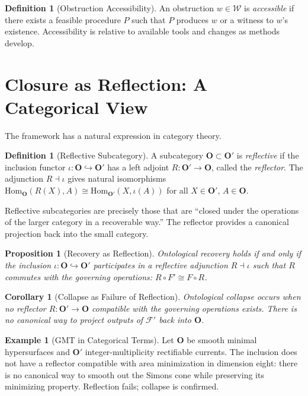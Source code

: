 \documentclass[12pt,oneside]{book}
\theoremstyle{plain}
\newtheorem{proposition}[theorem]{Proposition}
\newtheorem{corollary}[theorem]{Corollary}
\theoremstyle{definition}
\newtheorem{definition}[theorem]{Definition}
\newtheorem{example}[theorem]{Example}
\theoremstyle{remark}
\newcommand{\F}{\mathcal{F}}
\newcommand{\W}{\mathcal{W}}
\newcommand{\bO}{\mathbf{O}}
\newcommand{\bOn}{\mathbf{O}'}
\begin{document}
\begin{definition}[Obstruction Accessibility]
An obstruction $w \in \W$ is \emph{accessible} if there exists a feasible
procedure $P$ such that $P$ produces $w$ or a witness to $w$'s existence.
Accessibility is relative to available tools and changes as methods develop.
\end{definition}

\section{Closure as Reflection: A Categorical View}

The framework has a natural expression in category theory.

\begin{definition}[Reflective Subcategory]
A subcategory $\bO \subset \bOn$ is \emph{reflective} if the inclusion
functor $\iota : \bO \hookrightarrow \bOn$ has a left adjoint
$R : \bOn \to \bO$, called the \emph{reflector}. The adjunction
$R \dashv \iota$ gives natural isomorphisms
$\mathrm{Hom}_{\bO}(R(X), A) \cong \mathrm{Hom}_{\bOn}(X, \iota(A))$
for all $X \in \bOn$, $A \in \bO$.
\end{definition}

Reflective subcategories are precisely those that are ``closed under the
operations of the larger category in a recoverable way.'' The reflector
provides a canonical projection back into the small category.

\begin{proposition}[Recovery as Reflection]
Ontological recovery holds if and only if the inclusion
$\iota : \bO \hookrightarrow \bOn$ participates in a reflective adjunction
$R \dashv \iota$ such that $R$ commutes with the governing operations:
$R \circ F' \cong F \circ R$.
\end{proposition}

\begin{corollary}[Collapse as Failure of Reflection]
\label{cor:collapse-reflection}
Ontological collapse occurs when no reflector $R : \bOn \to \bO$ compatible
with the governing operations exists. There is no canonical way to project
outputs of $\F'$ back into $\bO$.
\end{corollary}

\begin{example}[GMT in Categorical Terms]
Let $\bO$ be smooth minimal hypersurfaces and $\bOn$ integer-multiplicity
rectifiable currents. The inclusion does not have a reflector compatible with
area minimization in dimension eight: there is no canonical way to smooth out
the Simons cone while preserving its minimizing property. Reflection fails;
collapse is confirmed.
\end{example}
\end{document}
